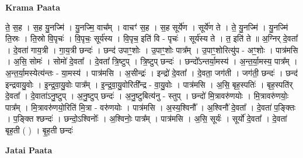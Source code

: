 \documentclass[17pt]{extarticle}
\begin{document}
\textbf{Krama Paata} \newline

ते॒ स॒ह । स॒ह यु॒नज्मि॑ । यु॒नज्मि॒ वाच᳚म् । वाचꣳ॑ स॒ह । स॒ह सूर्ये॑ण । सूर्ये॑ण ते । ते॒ यु॒नज्मि॑ । यु॒नज्मि॑ ति॒स्रः । ति॒स्रो वि॒पृचः॑ । वि॒पृचः॒ सूर्य॑स्य । वि॒पृच॒ इति॑ वि - पृचः॑ । सूर्य॑स्य ते । त॒ इति॑ ते ॥ अ॒ग्निर् दे॒वता᳚ । दे॒वता॑ गाय॒त्री । गा॒य॒त्री छन्दः॑ । छन्द॑ उपाꣳ॒॒शोः । उ॒पाꣳ॒॒शोः पात्र᳚म् । उ॒पाꣳ॒॒शोरित्यु॑प - अꣳ॒॒शोः । पात्र॑मसि । अ॒सि॒ सोमः॑ । सोमो॑ दे॒वता᳚ । दे॒वता᳚ त्रि॒ष्टुप् । त्रि॒ष्टुप् छन्दः॑ । छन्दो᳚ऽन्तर्या॒मस्य॑ । अ॒न्त॒र्या॒मस्य॒ पात्र᳚म् । अ॒न्त॒र्या॒मस्येत्य॑न्तः - या॒मस्य॑ । पात्र॑मसि । अ॒सीन्द्रः॑ । इन्द्रो॑ दे॒वता᳚ । दे॒वता॒ जग॑ती । जग॑ती॒ छन्दः॑ । छन्द॑ इन्द्रवायु॒वोः । इ॒न्द्र॒वा॒यु॒वोः पात्र᳚म् । इ॒न्द्र॒वा॒यु॒वोरिती᳚न्द्र - वा॒यु॒वोः । पात्र॑मसि । अ॒सि॒ बृह॒स्पतिः॑ । बृह॒स्पति॑र् दे॒वता᳚ । दे॒वाता॑ऽनु॒ष्टुप् । अ॒नु॒ष्टुप् छन्दः॑ । अ॒नु॒ष्टुबित्य॑नु - स्तुप् । छन्दो॑ मि॒त्रावरु॑णयोः । मि॒त्रावरु॑णयोः॒ पात्र᳚म् । मि॒त्रावरु॑णयो॒रिति॑ मि॒त्रा - वरु॑णयोः । पात्र॑मसि । अ॒स्य॒श्विनौ᳚ । अ॒श्विनौ॑ दे॒वता᳚ । दे॒वता॑ प॒ङ्क्तिः । प॒ङ्क्ति श्छन्दः॑ । छन्दो॒ऽश्विनोः᳚ । अ॒श्विनोः॒ पात्र᳚म् । पात्र॑मसि । अ॒सि॒ सूर्यः॑ । सूर्यो॑ दे॒वता᳚ । दे॒वता॑ बृह॒ती ( ) । बृ॒ह॒ती छन्दः॑ \newline

\textbf{Jatai Paata} \newline
\end{document}
